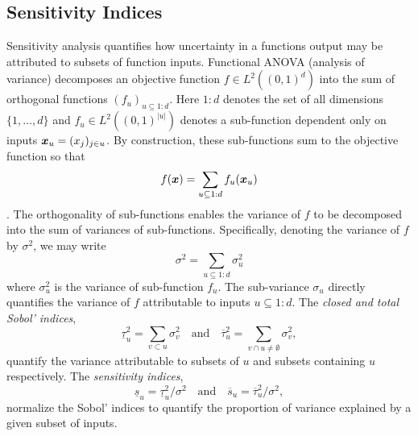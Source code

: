\documentclass{article}[12pt]
\begin{document}
\subsection{Sensitivity Indices}

Sensitivity analysis quantifies how uncertainty in a functions output may be attributed to subsets of function inputs. Functional ANOVA (analysis of variance) decomposes an objective function $f \in L^2((0,1)^d)$ into the sum of orthogonal functions $(f_u)_{u \subseteq 1:d}$. Here $1:d$ denotes the set of all dimensions $\{1,\dots,d\}$ and $f_u \in L^2((0,1)^{\lvert u \rvert})$ denotes a sub-function dependent only on inputs $\boldsymbol{x}_u = (x_j)_{j \in u}$. By construction, these sub-functions sum to the objective function so that
\begin{equation}
    f(\boldsymbol{x}) = \sum_{u \subseteq 1:d} f_u(\boldsymbol{x}_u) \label{eq:fanova}
\end{equation}
\cite[Appendix A]{mcbook}. The orthogonality of sub-functions enables the variance of $f$ to be decomposed into the sum of variances of sub-functions. Specifically, denoting the variance of $f$ by $\sigma^2$, we may write
\begin{equation*}
    \sigma^2 = \sum_{u \subseteq 1:d} \sigma^2_u
\end{equation*}
where $\sigma^2_u$ is the variance of sub-function $f_u$. The sub-variance $\sigma_u$ directly quantifies the variance of $f$ attributable to inputs $u \subseteq 1:d$.  The \emph{closed and total Sobol' indices},
\begin{equation}
    \label{eq:sobol_indices}
    \underline{\tau}_u^2 = \sum_{v \subset u} \sigma^2_v \quad \text{and} \quad 
    \overline{\tau}_u^2 = \sum_{v \cap u \neq \emptyset} \sigma^2_v,
\end{equation}
quantify the variance attributable to subsets of $u$ and subsets containing $u$ respectively. The \emph{sensitivity indices},
\begin{equation}
    \label{eq:sensitivity_indices_og}
    \underline{s}_u = \underline{\tau}_u^2/\sigma^2 \quad \text{and} \quad 
    \overline{s}_u = \overline{\tau}_u^2/\sigma^2,
\end{equation}
normalize the Sobol' indices to quantify the proportion of variance explained by a given subset of inputs. 
\end{document}
